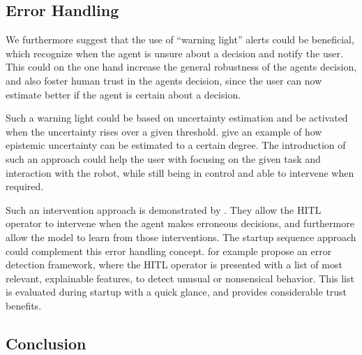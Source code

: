 \documentclass[twoside,11pt]{article}
\begin{document}
\subsection{Error Handling}
We furthermore suggest that the use of ``warning light'' alerts could be beneficial, which recognize when the agent is unsure about a decision and notify the user. This could on the one hand increase the general robustness of the agents decision, and also foster human trust in the agents decision, since the user can now estimate better if the agent is certain about a decision.

Such a warning light could be based on uncertainty estimation and be activated when the uncertainty rises over a given threshold. \citet{JainEtAl:2021:EpistemicUncertaintyPrediction} give an example of how epistemic uncertainty can be estimated to a certain degree. The introduction of such an approach could help the user with focusing on the given task and interaction with the robot, while still being in control and able to intervene when required.

Such an intervention approach is demonstrated by \citet{WuEtAl:2021:HITLDRLAutonomousDriving}. They allow the HITL operator to intervene when the agent makes erroneous decisions, and furthermore allow the model to learn from those interventions. 
The startup sequence approach could complement this error handling concept. \citet{LiuGuoMahmud:2021:HITLErrorDetectionFramework} for example propose an error detection framework, where the HITL operator is presented with a list of most relevant, explainable features, to detect unusual or nonsensical behavior. This list is evaluated during startup with a quick glance, and provides considerable trust benefits.\\


\subsection{Conclusion}
\end{document}
